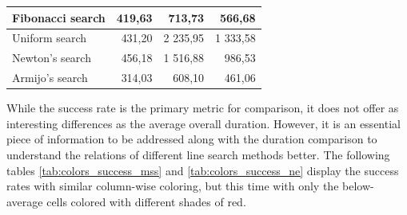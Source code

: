 \documentclass[english, 12pt, a4paper, sci, utf8, a-1b, online, table]{aaltothesis}
\begin{document}
\begin{table}[H]
\begin{tabular}{|l|r|r|r|}
    Fibonacci search                                                           & 419,63                                                    & \cellcolor[HTML]{C9E9D9}713,73                           & \cellcolor[HTML]{A5DABF}566,68                                \\ \hline
    Uniform search                                                             & 431,20                                                    & \cellcolor[HTML]{E67B73}2 235,95                         & \cellcolor[HTML]{EDA19C}1 333,58                              \\ \hline
    Newton's search                                                             & 456,18                                                    & \cellcolor[HTML]{EDA19C}1 516,88                         & \cellcolor[HTML]{F7D3D0}986,53                                \\ \hline
    Armijo's search                                                              & \cellcolor[HTML]{57BB89}314,03                            & \cellcolor[HTML]{57BB89}608,10                           & \cellcolor[HTML]{57BB89}461,06                                \\ \hline
    \end{tabular}
\end{table}


While the success rate is the primary metric for comparison, it does not offer as interesting differences as the average overall duration. However, it is an essential piece of information to be addressed along with the duration comparison to understand the relations of different line search methods better. The following tables \ref{tab:colors_success_mss} and \ref{tab:colors_success_ne} display the success rates with similar column-wise coloring, but this time with only the below-average cells colored with different shades of red.
\end{document}
